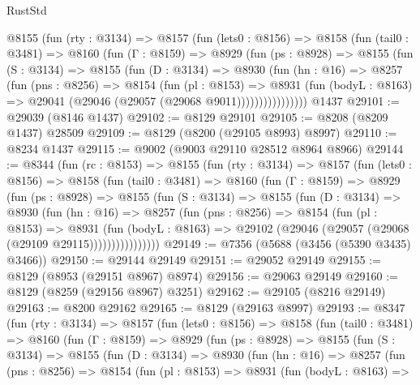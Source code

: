 \begin{lexlean}{RustStd}
\begin{coremodule}
      @8155
        (fun (rty : @3134) =>
        @8157
          (fun (lets0 : @8156) =>
          @8158
            (fun (tail0 : @3481) =>
            @8160
              (fun (Γ : @8159) =>
              @8929
                (fun (ps : @8928) =>
                @8155
                  (fun (S : @3134) =>
                  @8155
                    (fun (D : @3134) =>
                    @8930
                      (fun (hn : @16) =>
                      @8257
                        (fun (pns : @8256) =>
                        @8154
                          (fun (pl : @8153) =>
                          @8931
                            (fun (bodyL : @8163) =>
                            @29041 (@29046 (@29057 (@29068 @9011))))))))))))))))
    @1437
@29101 := @29039 (@8146 @1437)
@29102 := @8129 @29101
@29105 := @8208 (@8209 @1437) @28509
@29109 := @8129 (@8200 (@29105 @8993) @8997)
@29110 := @8234 @1437
@29115 := @9002 (@9003 @29110 @28512 @8964 @8966)
@29144 := @8344
    (fun (rc : @8153) =>
    @8155
      (fun (rty : @3134) =>
      @8157
        (fun (lets0 : @8156) =>
        @8158
          (fun (tail0 : @3481) =>
          @8160
            (fun (Γ : @8159) =>
            @8929
              (fun (ps : @8928) =>
              @8155
                (fun (S : @3134) =>
                @8155
                  (fun (D : @3134) =>
                  @8930
                    (fun (hn : @16) =>
                    @8257
                      (fun (pns : @8256) =>
                      @8154
                        (fun (pl : @8153) =>
                        @8931
                          (fun (bodyL : @8163) =>
                          @29102 (@29046 (@29057 (@29068 (@29109 @29115))))))))))))))))
@29149 := @7356 (@5688 (@3456 (@5390 @3435) @3466))
@29150 := @29144 @29149
@29151 := @29052 @29149
@29155 := @8129 (@8953 (@29151 @8967) @8974)
@29156 := @29063 @29149
@29160 := @8129 (@8259 (@29156 @8967) @3251)
@29162 := @29105 (@8216 @29149)
@29163 := @8200 @29162
@29165 := @8129 (@29163 @8997)
@29193 := @8347
    (fun (rty : @3134) =>
    @8157
      (fun (lets0 : @8156) =>
      @8158
        (fun (tail0 : @3481) =>
        @8160
          (fun (Γ : @8159) =>
          @8929
            (fun (ps : @8928) =>
            @8155
              (fun (S : @3134) =>
              @8155
                (fun (D : @3134) =>
                @8930
                  (fun (hn : @16) =>
                  @8257
                    (fun (pns : @8256) =>
                    @8154
                      (fun (pl : @8153) =>
                      @8931
                        (fun (bodyL : @8163) =>

\end{coremodule}
\end{lexlean}
